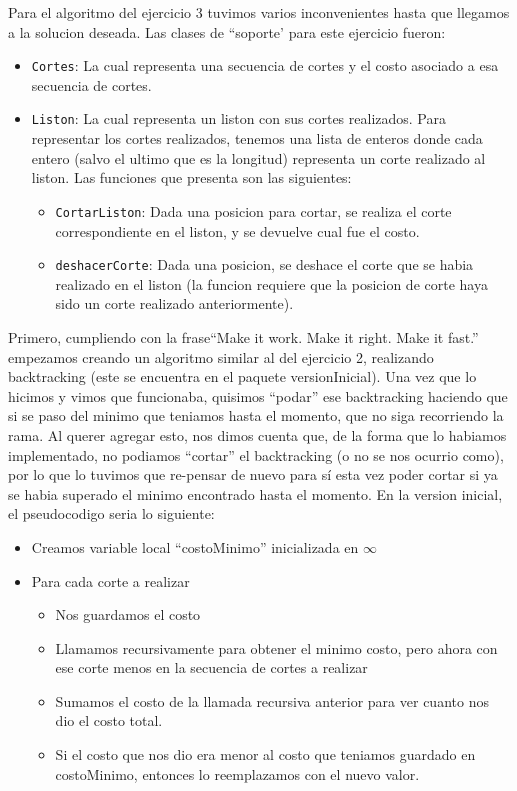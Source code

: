 \documentclass[12pt, a4paper,english,spanish]{article}
\begin{document}
Para el algoritmo del ejercicio 3 tuvimos varios inconvenientes hasta que llegamos a la solucion deseada. Las clases de ``soporte' para este ejercicio fueron:

\begin{itemize}
\item\texttt{Cortes}: La cual representa una secuencia de cortes y el costo asociado a esa secuencia de cortes.
\item\texttt{Liston}: La cual representa un liston con sus cortes realizados. Para representar los cortes realizados, tenemos una lista de enteros donde cada entero (salvo el ultimo que es la longitud) representa un corte realizado al liston. Las funciones que presenta son las siguientes:
\begin{itemize}
\item \texttt{CortarListon}: Dada una posicion para cortar, se realiza el corte correspondiente en el liston, y se devuelve cual fue el costo.
\item \texttt{deshacerCorte}: Dada una posicion, se deshace el corte que se habia realizado en el liston (la funcion requiere que la posicion de corte haya sido un corte realizado anteriormente).
\end{itemize}
\end{itemize}



Primero, cumpliendo con la frase``Make it work. Make it right. Make it fast.''  empezamos creando un algoritmo similar al del ejercicio 2, realizando backtracking (este se encuentra en el paquete versionInicial). Una vez que lo hicimos y vimos que funcionaba, quisimos ``podar'' ese backtracking haciendo que si se paso del minimo que teniamos hasta el momento, que no siga recorriendo la rama. Al querer agregar esto, nos dimos cuenta que, de la forma que lo habiamos implementado, no podiamos ``cortar'' el backtracking (o no se nos ocurrio como), por lo que lo tuvimos que re-pensar de nuevo para s\'i esta vez poder cortar si ya se habia superado el minimo encontrado hasta el momento. En la version inicial, el pseudocodigo seria lo siguiente:

\vspace{0.5cm}

\begin{itemize}
\item Creamos variable local ``costoMinimo'' inicializada en $\infty$
\item Para cada corte a realizar
\begin{itemize}
\item Nos guardamos el costo
\item Llamamos recursivamente para obtener el minimo costo, pero ahora con ese corte menos en la secuencia de cortes a realizar
\item Sumamos el costo de la llamada recursiva anterior para ver cuanto nos dio el costo total.
\item Si el costo que nos dio era menor al costo que teniamos guardado en costoMinimo, entonces lo reemplazamos con el nuevo valor.
\end{itemize}
\end{itemize}
\end{document}
